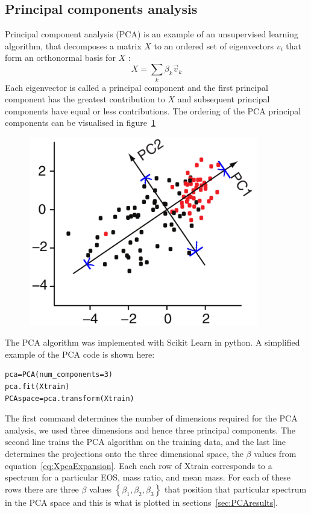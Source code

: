 \subsection{Principal components analysis}
\label{sec:PCA}
Principal component analysis (PCA) is an example of an unsupervised learning algorithm, that decomposes a matrix $X$ to an ordered set of eigenvectors $v_i$ that form an orthonormal basis for $X$ \cite[eg][]{Clark2015,Wall2003}:
\begin{equation}
	X = \displaystyle\sum_k \beta_k \vec{v}_k
	\label{eq:XpcaExpansion}
\end{equation}
Each eigenvector is called a principal component and the first principal component has the greatest contribution to $X$ and subsequent principal components have equal or less contributions. The ordering of the PCA principal components can be visualised in figure~\ref{fig:PCArelativeimportance}
\begin{figure}[H]
	\centering
	\includegraphics[width=10cm]{./img/PCArelativeimportance.png} 
	\caption[\protect]{\protect}%
	\label{fig:PCArelativeimportance}
\end{figure}
The PCA algorithm was implemented with Scikit Learn \cite{scikit-learn} in python. A simplified example of the PCA code is shown here:
\begin{lstlisting}[basicstyle=\small]
pca=PCA(num_components=3)
pca.fit(Xtrain)
PCAspace=pca.transform(Xtrain)
\end{lstlisting}
The first command determines the number of dimensions required for the PCA analysis, we used three dimensions and hence three principal components. The second line trains the PCA algorithm on the training data, and the last line determines the projections onto the three dimensional space, the $\beta$ values from equation~\ref{eq:XpcaExpansion}. Each each row of Xtrain corresponds to a spectrum for a particular EOS, mass ratio, and mean mass. For each of these rows there are three $\beta$ values $\left\lbrace \beta_1, \beta_2, \beta_3 \right\rbrace $ that position that particular spectrum in the PCA space and this is what is plotted in sections~\ref{sec:PCAresults}. 
